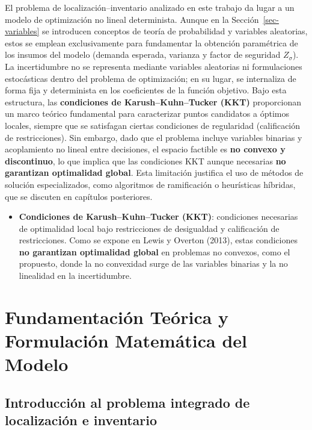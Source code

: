 \documentclass[
  spanish,
  us-letterpaper,
]{scrreprt}
\providecommand{\tightlist}{%
  \setlength{\itemsep}{0pt}\setlength{\parskip}{0pt}}
\numberwithin{equation}{section}
\begin{document}
El problema de localización--inventario analizado en este trabajo da
lugar a un modelo de optimización no lineal determinista. Aunque en la
Sección~\ref{sec-variables} se introducen conceptos de teoría de
probabilidad y variables aleatorias, estos se emplean exclusivamente
para fundamentar la obtención paramétrica de los insumos del modelo
(demanda esperada, varianza y factor de seguridad \(Z_{\sigma}\)). La
incertidumbre no se representa mediante variables aleatorias ni
formulaciones estocásticas dentro del problema de optimización; en su
lugar, se internaliza de forma fija y determinista en los coeficientes
de la función objetivo. Bajo esta estructura, las \textbf{condiciones de
Karush--Kuhn--Tucker (KKT)} proporcionan un marco teórico fundamental
para caracterizar puntos candidatos a óptimos locales, siempre que se
satisfagan ciertas condiciones de regularidad (calificación de
restricciones). Sin embargo, dado que el problema incluye variables
binarias y acoplamiento no lineal entre decisiones, el espacio factible
es \textbf{no convexo y discontinuo}, lo que implica que las condiciones
KKT aunque necesarias \textbf{no garantizan optimalidad global}. Esta
limitación justifica el uso de métodos de solución especializados, como
algoritmos de ramificación o heurísticas híbridas, que se discuten en
capítulos posteriores.

\begin{itemize}
\tightlist
\item
  \textbf{Condiciones de Karush--Kuhn--Tucker (KKT)}: condiciones
  necesarias de optimalidad local bajo restricciones de desigualdad y
  calificación de restricciones. Como se expone en Lewis y Overton
  (2013), estas condiciones \textbf{no garantizan optimalidad global} en
  problemas no convexos, como el propuesto, donde la no convexidad surge
  de las variables binarias y la no linealidad en la incertidumbre.
\end{itemize}


\chapter{Fundamentación Teórica y Formulación Matemática del
Modelo}\label{fundamentaciuxf3n-teuxf3rica-y-formulaciuxf3n-matemuxe1tica-del-modelo}

\section{Introducción al problema integrado de localización e
inventario}\label{sec-problemas}
\end{document}
